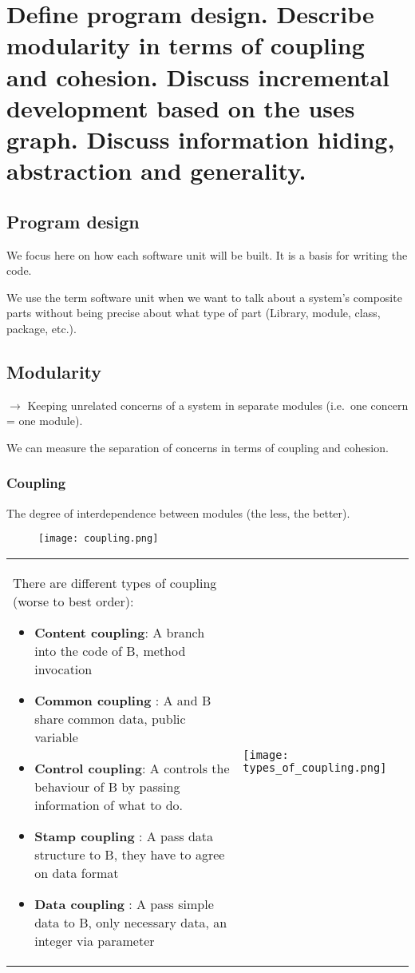 \clearpage{}

\section{Define program design. Describe modularity in terms of coupling
and cohesion. Discuss incremental development based on the uses graph.
Discuss information hiding, abstraction and generality.}

\subsection{Program design}

We focus here on how each software unit will be built. It is a basis for writing the code. \newline

We use the term software unit when we want to talk about a system’s composite parts
without being precise about what type of part (Library, module, class, package, etc.).

\subsection{Modularity}

$\rightarrow$ Keeping unrelated concerns of a system in separate modules (i.e.\ one concern = one
module).

We can measure the separation of concerns in terms of coupling and cohesion.

\subsubsection{Coupling}

The degree of interdependence between modules (the less, the better).

\begin{figure}[!ht]
    \centering
    \texttt{[image: coupling.png]}
\end{figure}


\begin{tabular}{m{11cm}m{7cm}}
There are different types of coupling (worse to best order):
\begin{itemize}
    \item \textbf{Content coupling}: A branch into the code of B, method invocation
    \item \textbf{Common coupling }: A and B share common data, public variable
    \item \textbf{Control coupling}: A controls the behaviour of B by passing information of what to do.
    \item \textbf{Stamp coupling  }: A pass data structure to B, they have to agree on data format
    \item \textbf{Data coupling   }: A pass simple data to B, only necessary data, an integer via parameter
\end{itemize}
&
    \texttt{[image: types\_of\_coupling.png]}
\end{tabular}


